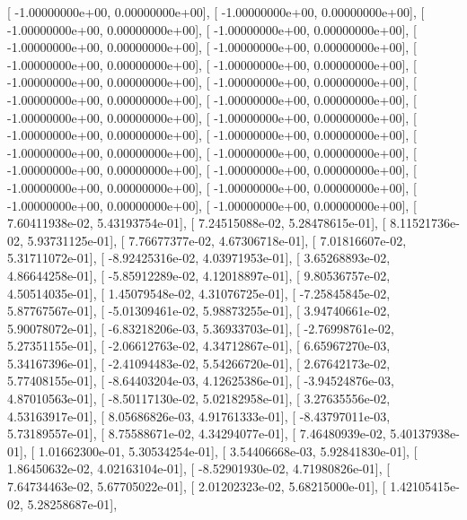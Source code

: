 \documentclass{article}
\begin{document}
       [ -1.00000000e+00,   0.00000000e+00],
       [ -1.00000000e+00,   0.00000000e+00],
       [ -1.00000000e+00,   0.00000000e+00],
       [ -1.00000000e+00,   0.00000000e+00],
       [ -1.00000000e+00,   0.00000000e+00],
       [ -1.00000000e+00,   0.00000000e+00],
       [ -1.00000000e+00,   0.00000000e+00],
       [ -1.00000000e+00,   0.00000000e+00],
       [ -1.00000000e+00,   0.00000000e+00],
       [ -1.00000000e+00,   0.00000000e+00],
       [ -1.00000000e+00,   0.00000000e+00],
       [ -1.00000000e+00,   0.00000000e+00],
       [ -1.00000000e+00,   0.00000000e+00],
       [ -1.00000000e+00,   0.00000000e+00],
       [ -1.00000000e+00,   0.00000000e+00],
       [ -1.00000000e+00,   0.00000000e+00],
       [ -1.00000000e+00,   0.00000000e+00],
       [ -1.00000000e+00,   0.00000000e+00],
       [ -1.00000000e+00,   0.00000000e+00],
       [ -1.00000000e+00,   0.00000000e+00],
       [ -1.00000000e+00,   0.00000000e+00],
       [ -1.00000000e+00,   0.00000000e+00],
       [ -1.00000000e+00,   0.00000000e+00],
       [ -1.00000000e+00,   0.00000000e+00],
       [  7.60411938e-02,   5.43193754e-01],
       [  7.24515088e-02,   5.28478615e-01],
       [  8.11521736e-02,   5.93731125e-01],
       [  7.76677377e-02,   4.67306718e-01],
       [  7.01816607e-02,   5.31711072e-01],
       [ -8.92425316e-02,   4.03971953e-01],
       [  3.65268893e-02,   4.86644258e-01],
       [ -5.85912289e-02,   4.12018897e-01],
       [  9.80536757e-02,   4.50514035e-01],
       [  1.45079548e-02,   4.31076725e-01],
       [ -7.25845845e-02,   5.87767567e-01],
       [ -5.01309461e-02,   5.98873255e-01],
       [  3.94740661e-02,   5.90078072e-01],
       [ -6.83218206e-03,   5.36933703e-01],
       [ -2.76998761e-02,   5.27351155e-01],
       [ -2.06612763e-02,   4.34712867e-01],
       [  6.65967270e-03,   5.34167396e-01],
       [ -2.41094483e-02,   5.54266720e-01],
       [  2.67642173e-02,   5.77408155e-01],
       [ -8.64403204e-03,   4.12625386e-01],
       [ -3.94524876e-03,   4.87010563e-01],
       [ -8.50117130e-02,   5.02182958e-01],
       [  3.27635556e-02,   4.53163917e-01],
       [  8.05686826e-03,   4.91761333e-01],
       [ -8.43797011e-03,   5.73189557e-01],
       [  8.75588671e-02,   4.34294077e-01],
       [  7.46480939e-02,   5.40137938e-01],
       [  1.01662300e-01,   5.30534254e-01],
       [  3.54406668e-03,   5.92841830e-01],
       [  1.86450632e-02,   4.02163104e-01],
       [ -8.52901930e-02,   4.71980826e-01],
       [  7.64734463e-02,   5.67705022e-01],
       [  2.01202323e-02,   5.68215000e-01],
       [  1.42105415e-02,   5.28258687e-01],
\end{document}
